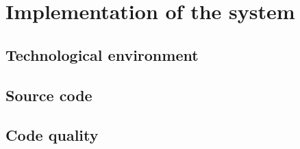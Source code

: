 \chapter{Implementation of the system}

\section{Technological environment}


\section{Source code}


\section{Code quality}